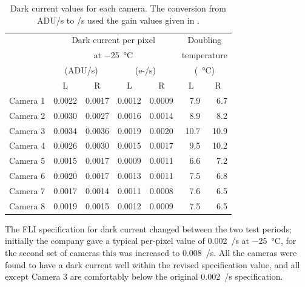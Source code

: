 \begin{colsection}
\begin{colsection}
\begin{table}[t]
    \begin{center}
        \begin{tabular}{c|cc|cc|rr} %
             &
            \multicolumn{4}{c|}{Dark current per pixel} &
            \multicolumn{2}{c}{Doubling} \\
             &
            \multicolumn{4}{c|}{at \SI{-25}{\celsius}} &
            \multicolumn{2}{c}{temperature} \\
             &
            \multicolumn{2}{c|}{(ADU/s)} &
            \multicolumn{2}{c|}{(e-/s)} &
            \multicolumn{2}{c}{(\SI{}{\celsius})} \\
             & L & R & L & R &
             \multicolumn{1}{c}{L} & \multicolumn{1}{c}{R} \\
            \midrule
            Camera 1 & 0.0022 & 0.0017 & 0.0012 & 0.0009 &  7.9 &  6.7 \\
            Camera 2 & 0.0030 & 0.0027 & 0.0016 & 0.0014 &  8.9 &  8.2 \\
            Camera 3 & 0.0034 & 0.0036 & 0.0019 & 0.0020 & 10.7 & 10.9 \\
            Camera 4 & 0.0026 & 0.0030 & 0.0015 & 0.0017 &  9.5 & 10.2 \\
            Camera 5 & 0.0015 & 0.0017 & 0.0009 & 0.0011 &  6.6 &  7.2 \\
            Camera 6 & 0.0020 & 0.0017 & 0.0013 & 0.0011 &  7.5 &  6.8 \\
            Camera 7 & 0.0017 & 0.0014 & 0.0011 & 0.0008 &  7.6 &  6.5 \\
            Camera 8 & 0.0019 & 0.0015 & 0.0012 & 0.0009 &  7.5 &  6.5 \\
        \end{tabular}
    \end{center}
    \caption[Dark current values]{
        Dark current values for each camera. The conversion from ADU/s to \elec/s used the gain values given in .
    }\label{tab:dc}
\end{table}

The FLI specification for dark current changed between the two test periods; initially the company gave a typical per-pixel value of 0.002~\elec/s at \SI{-25}{\celsius}, for the second set of cameras this was increased to 0.008~\elec/s. All the cameras were found to have a dark current well within the revised specification value, and all except Camera 3 are comfortably below the original 0.002~\elec/s specification.


\end{colsection}
\end{colsection}
